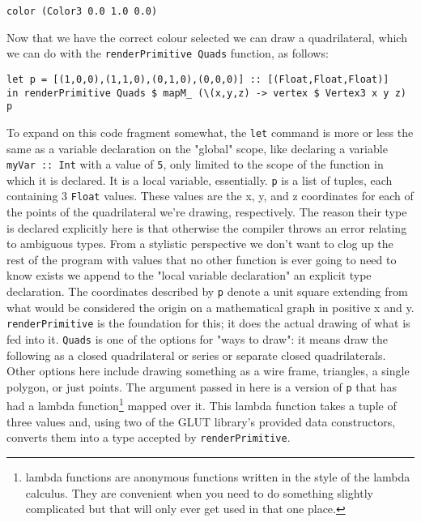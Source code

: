 \documentclass[12pt, a4paper]{report}
\begin{document}
\begin{lstlisting}
color (Color3 0.0 1.0 0.0)
\end{lstlisting}

Now that we have the correct colour selected we can draw a quadrilateral, which we can do with the \verb|renderPrimitive Quads| function, as follows:

\begin{lstlisting}[]
let p = [(1,0,0),(1,1,0),(0,1,0),(0,0,0)] :: [(Float,Float,Float)]
in renderPrimitive Quads $ mapM_ (\(x,y,z) -> vertex $ Vertex3 x y z) p
\end{lstlisting}

To expand on this code fragment somewhat, the \verb|let| command is more or less the same as a variable declaration on the "global" scope, like declaring a variable \verb|myVar :: Int| with a value of \verb|5|, only limited to the scope of the function in which it is declared.
It is a local variable, essentially.
\verb|p| is a list of tuples, each containing 3 \verb|Float| values.
These values are the x, y, and z coordinates for each of the points of the quadrilateral we're drawing, respectively.
The reason their type is declared explicitly here is that otherwise the compiler throws an error relating to ambiguous types.
From a stylistic perspective we don't want to clog up the rest of the program with values that no other function is ever going to need to know exists we append to the "local variable declaration" an explicit type declaration.
The coordinates described by \verb|p| denote a unit square extending from what would be considered the origin on a mathematical graph in positive x and y.
\verb|renderPrimitive| is the foundation for this; it does the actual drawing of what is fed into it.
\verb|Quads| is one of the options for "ways to draw": it means draw the following as a closed quadrilateral or series or separate closed quadrilaterals.
Other options here include drawing something as a wire frame, triangles, a single polygon, or just points.
The argument passed in here is a version of \verb|p| that has had a lambda function\footnote{lambda functions are anonymous functions written in the style of the lambda calculus. They are convenient when you need to do something slightly complicated but that will only ever get used in that one place.} mapped over it.
This lambda function takes a tuple of three values and, using two of the GLUT library's provided data constructors, converts them into a type accepted by \verb|renderPrimitive|.

\par
\end{document}
